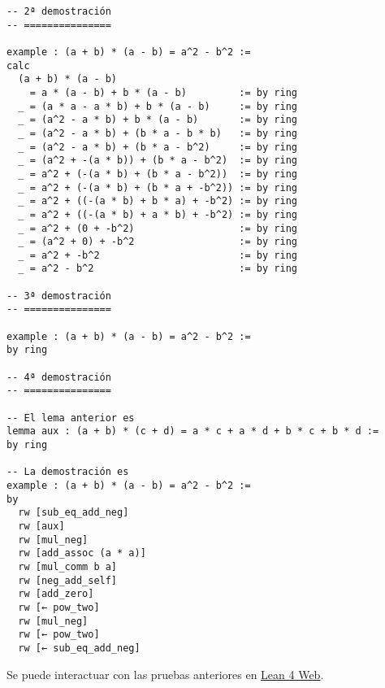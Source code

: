 \begin{verbatim}
-- 2ª demostración
-- ===============

example : (a + b) * (a - b) = a^2 - b^2 :=
calc
  (a + b) * (a - b)
    = a * (a - b) + b * (a - b)         := by ring
  _ = (a * a - a * b) + b * (a - b)     := by ring
  _ = (a^2 - a * b) + b * (a - b)       := by ring
  _ = (a^2 - a * b) + (b * a - b * b)   := by ring
  _ = (a^2 - a * b) + (b * a - b^2)     := by ring
  _ = (a^2 + -(a * b)) + (b * a - b^2)  := by ring
  _ = a^2 + (-(a * b) + (b * a - b^2))  := by ring
  _ = a^2 + (-(a * b) + (b * a + -b^2)) := by ring
  _ = a^2 + ((-(a * b) + b * a) + -b^2) := by ring
  _ = a^2 + ((-(a * b) + a * b) + -b^2) := by ring
  _ = a^2 + (0 + -b^2)                  := by ring
  _ = (a^2 + 0) + -b^2                  := by ring
  _ = a^2 + -b^2                        := by ring
  _ = a^2 - b^2                         := by ring

-- 3ª demostración
-- ===============

example : (a + b) * (a - b) = a^2 - b^2 :=
by ring

-- 4ª demostración
-- ===============

-- El lema anterior es
lemma aux : (a + b) * (c + d) = a * c + a * d + b * c + b * d :=
by ring

-- La demostración es
example : (a + b) * (a - b) = a^2 - b^2 :=
by
  rw [sub_eq_add_neg]
  rw [aux]
  rw [mul_neg]
  rw [add_assoc (a * a)]
  rw [mul_comm b a]
  rw [neg_add_self]
  rw [add_zero]
  rw [← pow_two]
  rw [mul_neg]
  rw [← pow_two]
  rw [← sub_eq_add_neg]
\end{verbatim}
Se puede interactuar con las pruebas anteriores en \href{https://lean.math.hhu.de/\#url=https://raw.githubusercontent.com/jaalonso/Calculemus2/main/src/(a+b)(a-b)\_eq\_aa-bb.lean}{Lean 4 Web}.

